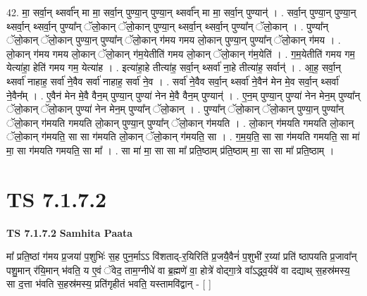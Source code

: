 \documentclass[17pt]{extarticle}
\begin{document}
42. मा॒ सर्वा॒न् थ्सर्वा᳚न् मा मा॒ सर्वा॒न् पुण्या॒न् पुण्या॒न् थ्सर्वा᳚न् मा मा॒ सर्वा॒न् पुण्यान्॑ । . सर्वा॒न् पुण्या॒न् पुण्या॒न् थ्सर्वा॒न् थ्सर्वा॒न् पुण्या᳚न् ॅलो॒कान् ॅलो॒कान् पुण्या॒न् थ्सर्वा॒न् थ्सर्वा॒न् पुण्या᳚न् ॅलो॒कान् । . पुण्या᳚न् ॅलो॒कान् ॅलो॒कान् पुण्या॒न् पुण्या᳚न् ॅलो॒कान् ग॑मय गमय लो॒कान् पुण्या॒न् पुण्या᳚न् ॅलो॒कान् ग॑मय । . लो॒कान् ग॑मय गमय लो॒कान् ॅलो॒कान् ग॑म॒येतीति॑ गमय लो॒कान् ॅलो॒कान् ग॑म॒येति॑ । . ग॒म॒येतीति॑ गमय गम॒ येत्या॑हा॒ हेति॑ गमय गम॒ येत्या॑ह । . इत्या॑हा॒हे तीत्या॑ह॒ सर्वा॒न् थ्सर्वा॑ ना॒हे तीत्या॑ह॒ सर्वान्॑ । . आ॒ह॒ सर्वा॒न् थ्सर्वा॑ नाहाह॒ सर्वा॑ ने॒वैव सर्वा॑ नाहाह॒ सर्वा॑ ने॒व । . सर्वा॑ ने॒वैव सर्वा॒न् थ्सर्वा॑ ने॒वैन॑ मेन मे॒व सर्वा॒न् थ्सर्वा॑ ने॒वैन᳚म् । . ए॒वैन॑ मेन मे॒वै वैन॒म् पुण्या॒न् पुण्या॑ नेन मे॒वै वैन॒म् पुण्यान्॑ । . ए॒न॒म् पुण्या॒न् पुण्या॑ नेन मेन॒म् पुण्या᳚न् ॅलो॒कान् ॅलो॒कान् पुण्या॑ नेन मेन॒म् पुण्या᳚न् ॅलो॒कान् । . पुण्या᳚न् ॅलो॒कान् ॅलो॒कान् पुण्या॒न् पुण्या᳚न् ॅलो॒कान् ग॑मयति गमयति लो॒कान् पुण्या॒न् पुण्या᳚न् ॅलो॒कान् ग॑मयति । . लो॒कान् ग॑मयति गमयति लो॒कान् ॅलो॒कान् ग॑मयति॒ सा सा ग॑मयति लो॒कान् ॅलो॒कान् ग॑मयति॒ सा । . ग॒म॒य॒ति॒ सा सा ग॑मयति गमयति॒ सा मा॑ मा॒ सा ग॑मयति गमयति॒ सा मा᳚ । . सा मा॑ मा॒ सा सा मा᳚ प्रति॒ष्ठाम् प्र॑ति॒ष्ठाम् मा॒ सा सा मा᳚ प्रति॒ष्ठाम् । \newline
\pagebreak
{}

\section{ TS 7.1.7.2 }

\textbf{TS 7.1.7.2 } \newline
\textbf{Samhita Paata} \newline

मा᳚ प्रति॒ष्ठां ग॑मय प्र॒जया॑ प॒शुभिः॑ स॒ह पुन॒र्माऽऽ वि॑शताद्-र॒यिरिति॑ प्र॒जयै॒वैनं॑ प॒शुभी॑ र॒य्यां प्रति॑ ष्ठापयति प्र॒जावा᳚न् पशु॒मान् र॑यि॒मान् भ॑वति॒ य ए॒वं ॅवेद॒ ताम॒ग्नीधे॑ वा ब्र॒ह्मणे॑ वा॒ होत्रे॑ वोद्गा॒त्रे वा᳚ऽद्ध्व॒र्यवे॑ वा दद्याथ् स॒हस्र॑मस्य॒ सा द॒त्ता भ॑वति स॒हस्र॑मस्य॒ प्रति॑गृहीतं भवति॒ यस्तामवि॑द्वान् - [  ] \newline
\end{document}
